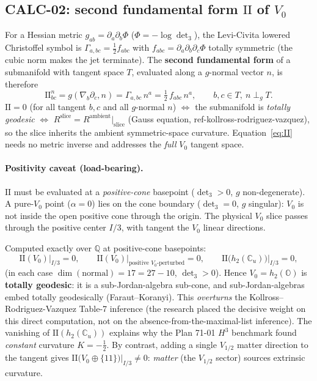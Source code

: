 \subsection{CALC-02: second fundamental form $\mathrm{II}$ of $V_0$}

For a Hessian metric $g_{ab}=\partial_a\partial_b\Phi$ ($\Phi=-\log\det_3$), the
Levi-Civita lowered Christoffel symbol is $\Gamma_{a,bc}=\tfrac12 f_{abc}$ with
$f_{abc}=\partial_a\partial_b\partial_c\Phi$ totally symmetric (the cubic norm makes
the jet terminate). The \textbf{second fundamental form} of a submanifold with
tangent space $T$, evaluated along a $g$-normal vector $n$, is therefore
\begin{equation}
\boxed{\ \mathrm{II}^n_{bc} = g(\nabla_b\partial_c, n) = \Gamma_{a,bc}\,n^a
= \tfrac12\, f_{abc}\, n^a, \qquad b,c\in T,\ n\perp_g T.\ }
\label{eq:II}
\end{equation}
$\mathrm{II}=0$ (for all tangent $b,c$ and all $g$-normal $n$) $\iff$ the submanifold
is \emph{totally geodesic} $\iff$ $R^{\mathrm{slice}} = R^{\mathrm{ambient}}|_{\mathrm{slice}}$
(Gauss equation, ref-kollross-rodriguez-vazquez), so the slice inherits the ambient
symmetric-space curvature. Equation~\eqref{eq:II} needs no metric inverse and
addresses the \emph{full} $V_0$ tangent space.

\paragraph{Positivity caveat (load-bearing).} $\mathrm{II}$ must be evaluated at a
\emph{positive-cone} basepoint ($\det_3>0$, $g$ non-degenerate). A pure-$V_0$ point
($\alpha=0$) lies on the cone boundary ($\det_3=0$, $g$ singular): $V_0$ is not
inside the open positive cone through the origin. The physical $V_0$ slice passes
through the positive center $I/3$, with tangent the $V_0$ linear directions.

Computed exactly over $\mathbb{Q}$ at positive-cone basepoints:
\[
\mathrm{II}(V_0)\big|_{I/3} = 0,\qquad
\mathrm{II}(V_0)\big|_{\text{positive }V_0\text{-perturbed}} = 0,\qquad
\mathrm{II}\bigl(h_2(\mathbb{C}_u)\bigr)\big|_{I/3} = 0,
\]
(in each case $\dim(\text{normal})=17=27-10$, $\det_3>0$). Hence $V_0=h_2(\mathbb{O})$
is \textbf{totally geodesic}: it is a sub-Jordan-algebra sub-cone, and sub-Jordan-algebras
embed totally geodesically (Faraut--Koranyi). This \emph{overturns} the
Kollross--Rodriguez-Vazquez Table-7 inference (the research placed the decisive
weight on this direct computation, not on the absence-from-the-maximal-list
inference). The vanishing of $\mathrm{II}(h_2(\mathbb{C}_u))$ explains why the Plan
71-01 $H^3$ benchmark found \emph{constant} curvature $K=-\tfrac12$. By contrast,
adding a single $V_{1/2}$ matter direction to the tangent gives
$\mathrm{II}\bigl(V_0\oplus\{11\}\bigr)\big|_{I/3}\neq 0$: \emph{matter} (the
$V_{1/2}$ sector) sources extrinsic curvature.

